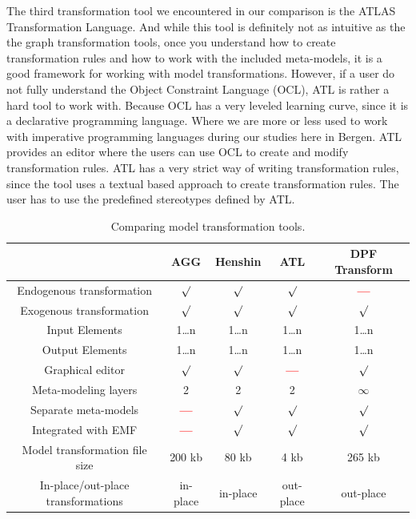 The third transformation tool we encountered in our comparison is the ATLAS
Transformation Language. And while this tool is definitely not as intuitive as
the the graph transformation tools, once you understand how to create
transformation rules and how to work with the included meta-models, it is a
good framework for working with model transformations. However, if a user do
not fully understand the Object Constraint Language (OCL), ATL is rather a hard
tool to work with. Because OCL has a very leveled learning curve, since it is a
declarative programming language. Where we are more or less used to work with
imperative programming languages during our studies here in Bergen. ATL
provides an editor where the users can use OCL to create and modify
transformation rules. ATL has a very strict way of writing transformation
rules, since the tool uses a textual based approach to create transformation
rules. The user has to use the predefined stereotypes defined by ATL.


\begin{table}[ht]
\renewcommand*\arraystretch{1.2}
\centering
\begin{tabular}{| c | c | c | c | c |}
\hline
& AGG & Henshin & ATL & DPF Transform \\
\hline
Endogenous transformation & $\surd$ & $\surd$ & $\surd$ & \textcolor{red}{\textbf{---}}\\

Exogenous transformation & $\surd$ & $\surd$ & $\surd$ & $\surd$\\

Input Elements & 1\ldots n & 1\ldots n & 1\ldots n & 1\ldots n\\

Output Elements & 1\ldots n & 1\ldots n & 1\ldots n & 1\ldots n\\

Graphical editor & $\surd$ & $\surd$ & \textcolor{red}{\textbf{---}} & $\surd$
\\

Meta-modeling layers & 2 & 2 & 2 & $\infty$ \\

Separate meta-models & \textcolor{red}{\textbf{---}} &  $\surd$ &  $\surd$ &  $\surd$ \\

Integrated with EMF & \textcolor{red}{\textbf{---}} & $\surd$ & $\surd$ & $\surd$ \\ 

Model transformation file size & 200 kb & 80 kb & 4 kb & 265 kb\\

In-place/out-place transformations & in-place &
in-place & out-place  & out-place \\

\hline
\end{tabular}
\caption{Comparing model transformation tools.}
\label{tab:comparing}
\end{table} 

